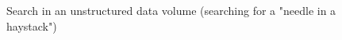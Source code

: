 \begin{figure}
\centering



\caption{Search in an unstructured data volume (searching for a "needle in a haystack")}
\label{figQuantCompSearch}
\end{figure}